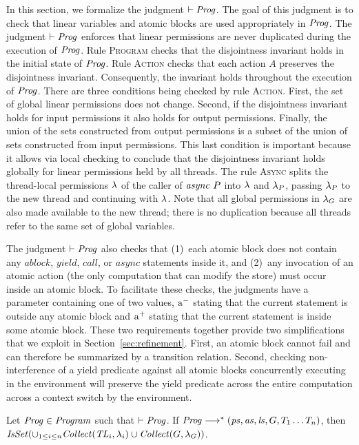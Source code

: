 In this section, we formalize the judgment $\vdash \mathit{Prog}$.
The goal of this judgment is to check that
linear variables and atomic blocks are used appropriately in $\mathit{Prog}$.
The judgment $\vdash \mathit{Prog}$ enforces that linear permissions are never duplicated during the 
execution of $\mathit{Prog}$.
Rule \textsc{Program} checks that the disjointness invariant holds in the initial state of $\mathit{Prog}$.
Rule \textsc{Action} checks that each action $A$ preserves the disjointness invariant.
Consequently, the invariant holds throughout the execution of $\mathit{Prog}$.
There are three conditions being checked by rule \textsc{Action}.
First, the set of global linear permissions does not change.
Second, if the disjointness invariant holds for input permissions it also holds for output permissions.
Finally, the union of the sets constructed from output permissions is a subset of the union of sets
constructed from input permissions.  
This last condition is important because it allows via local checking to conclude that the disjointness invariant holds globally
for linear permissions held by all threads.
The rule \textsc{Async} splits the thread-local permissions $\lambda$ of the caller of $\mathit{async}\ P$ into $\lambda$ 
and $\lambda_P$, passing $\lambda_P$ to the new thread and continuing with $\lambda$.
Note that all global permissions in $\lambda_G$ are also made available to the new thread;
there is no duplication because all threads refer to the same set of global variables.

The judgment $\vdash \mathit{Prog}$ also checks that 
(1)~each atomic block does not contain any $\mathit{ablock}$, $\mathit{yield}$, $\mathit{call}$, or $\mathit{async}$ statements inside it, and
(2)~any invocation of an atomic action (the only computation that can modify the store) must occur inside an atomic block.
To facilitate these checks, the judgments have a parameter containing one of two values,
$\mathrm{a^-}$ stating that the current statement is outside any atomic block and
$\mathrm{a^+}$ stating that the current statement is inside some atomic block.
These two requirements together provide two simplifications that we exploit in Section~\ref{sec:refinement}.
First, an atomic block cannot fail and can therefore be summarized by a transition relation.
Second, checking non-interference of a yield predicate against all atomic blocks concurrently executing 
in the environment will preserve the yield predicate across the entire computation across a context switch by the environment.

\begin{lemma}
Let $\mathit{Prog} \in \mathit{Program}$ such that $\vdash \mathit{Prog}$.
If $\mathit{Prog} \longrightarrow^* (\mathit{ps}, \mathit{as}, \mathit{ls}, G, T_1 \ldots T_n)$, 
then $\mathit{IsSet}(\cup_{1 \le i \le n} \mathit{Collect}(\mathit{TL}_i, \lambda_i) \cup \mathit{Collect}(G, \lambda_G))$.
\end{lemma}


